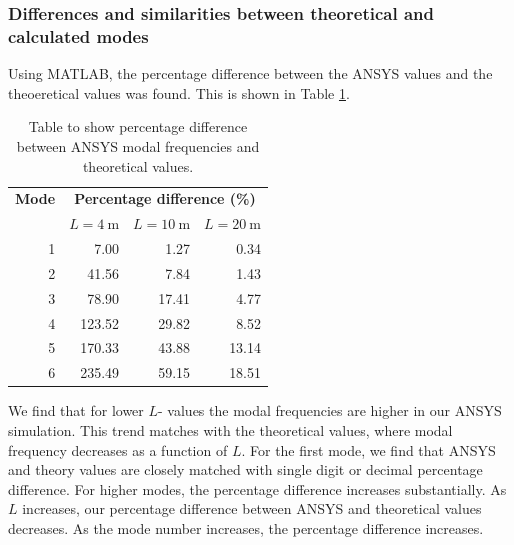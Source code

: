 \subsubsection{Differences and similarities between theoretical and calculated modes}
Using MATLAB, the percentage difference between the ANSYS values and the theoeretical values was found. This is shown in Table \ref{percDiffs}.
\begin{table}[H]
    \centering
    \begin{tabular}{@{}rrrr@{}}
        \toprule
        \textbf{Mode} & \multicolumn{3}{c}{\textbf{Percentage difference (\%)}}                                                 \\
                      & $L = \SI{4}{\meter}$                                    & $L = \SI{10}{\meter}$ & $L = \SI{20}{\meter}$ \\
        \midrule
        1             & 7.00                                                    & 1.27                  & 0.34                  \\
        2             & 41.56                                                   & 7.84                  & 1.43                  \\
        3             & 78.90                                                   & 17.41                 & 4.77                  \\
        4             & 123.52                                                  & 29.82                 & 8.52                  \\
        5             & 170.33                                                  & 43.88                 & 13.14                 \\
        6             & 235.49                                                  & 59.15                 & 18.51                 \\ \bottomrule
    \end{tabular}
    \caption{Table to show percentage difference between ANSYS modal frequencies and theoretical values.}
    \label{percDiffs}
\end{table}
We find that for lower $L$- values the modal frequencies are higher in our ANSYS simulation. This trend matches with the theoretical values, where modal frequency decreases as a function of $L$. For the first mode, we find that ANSYS and theory values are closely matched with single digit or decimal percentage difference. For higher modes, the percentage difference increases substantially. As $L$ increases, our percentage difference between ANSYS and theoretical values decreases. As the mode number increases, the percentage difference increases.

